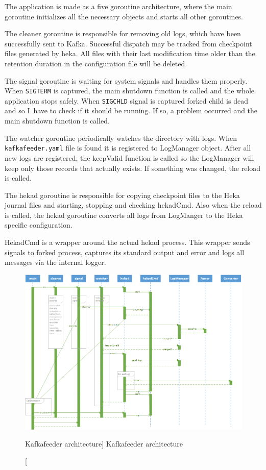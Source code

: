 The application is made as a five goroutine architecture, where the main goroutine initializes all the necessary objects and starts all other goroutines.

The cleaner goroutine is responsible for removing old logs, which have been successfully sent to Kafka. Successful dispatch may be tracked from checkpoint files generated by heka. All files with their last modification time older than the retention duration in the configuration file will be deleted.

The signal goroutine is waiting for system signals and handles them properly. When \lstinline{SIGTERM} is captured, the main shutdown function is called and the whole application stops safely. When \lstinline{SIGCHLD} signal is captured forked child is dead and so I~have to check if it should be running. If so, a problem occurred and the main shutdown function is called.

The watcher goroutine periodically watches the directory with logs. When \lstinline{kafkafeeder.yaml} file is found it is registered to LogManager object. After all new logs are registered, the keepValid function is called so the LogManager will keep only those records that actually exists. If something was changed, the reload is called.

The hekad goroutine is responsible for copying checkpoint files to the Heka journal files and starting, stopping and checking hekadCmd. Also when the reload is called, the hekad goroutine converts all logs from LogManger to the Heka specific configuration.

HekadCmd is a wrapper around the actual hekad process. This wrapper sends signals to forked process, captures its standard output and error and logs all messages via the internal logger.

\begin{figure}[htb]\centering
  \includegraphics[width=1\textwidth]{images/kafkafeeder.png}
  \caption
    [Kafkafeeder architecture]
    {Kafkafeeder architecture}
  \label{fig:kafkafeeder}
\end{figure}
                            
